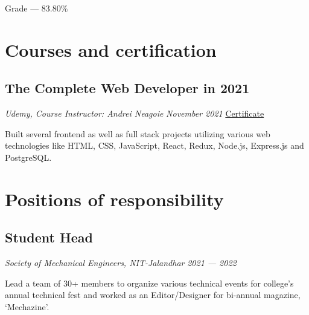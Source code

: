 \documentclass[a4paper]{article}
\begin{document}
Grade --- 83.80\%

\section{Courses and certification}
\subsection{The Complete Web Developer in 2021}
\textit{Udemy, Course Instructor: Andrei Neagoie}
\hfill
\textit{November 2021} \textbar \href{https://www.udemy.com/certificate/UC-13ddb4ce-86c8-4396-9cb7-701f5c522fd8/}{  Certificate \faExternalLink}

Built several frontend as well as full stack projects utilizing various web technologies like HTML, CSS, JavaScript, React, Redux, Node.js, Express.js and PostgreSQL.


\section{Positions of responsibility}
\subsection{Student Head}
\textit{Society of Mechanical Engineers, NIT-Jalandhar}
\hfill
\textit{2021 --- 2022}

Lead a team of 30+ members to organize various technical events for college's annual technical fest and worked as an Editor/Designer for bi-annual magazine, `Mechazine'.
\end{document}

